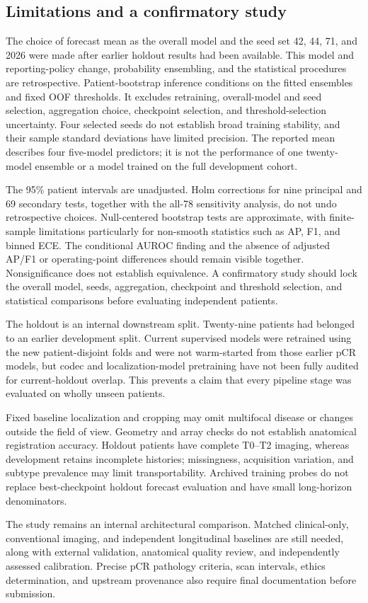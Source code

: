 \subsection{Limitations and a confirmatory study}
\label{sec:limitations}
The choice of forecast mean as the overall model and the seed set 42, 44, 71, and 2026 were made after earlier holdout results had been available. This model and reporting-policy change, probability ensembling, and the statistical procedures are retrospective. Patient-bootstrap inference conditions on the fitted ensembles and fixed OOF thresholds. It excludes retraining, overall-model and seed selection, aggregation choice, checkpoint selection, and threshold-selection uncertainty. Four selected seeds do not establish broad training stability, and their sample standard deviations have limited precision. The reported mean describes four five-model predictors; it is not the performance of one twenty-model ensemble or a model trained on the full development cohort.

The 95\% patient intervals are unadjusted. Holm corrections for nine principal and 69 secondary tests, together with the all-78 sensitivity analysis, do not undo retrospective choices. Null-centered bootstrap tests are approximate, with finite-sample limitations particularly for non-smooth statistics such as AP, F1, and binned ECE. The conditional AUROC finding and the absence of adjusted AP/F1 or operating-point differences should remain visible together. Nonsignificance does not establish equivalence. A confirmatory study should lock the overall model, seeds, aggregation, checkpoint and threshold selection, and statistical comparisons before evaluating independent patients.

The holdout is an internal downstream split. Twenty-nine patients had belonged to an earlier development split. Current supervised models were retrained using the new patient-disjoint folds and were not warm-started from those earlier pCR models, but codec and localization-model pretraining have not been fully audited for current-holdout overlap. This prevents a claim that every pipeline stage was evaluated on wholly unseen patients.

Fixed baseline localization and cropping may omit multifocal disease or changes outside the field of view. Geometry and array checks do not establish anatomical registration accuracy. Holdout patients have complete T0--T2 imaging, whereas development retains incomplete histories; missingness, acquisition variation, and subtype prevalence may limit transportability. Archived training probes do not replace best-checkpoint holdout forecast evaluation and have small long-horizon denominators.

The study remains an internal architectural comparison. Matched clinical-only, conventional imaging, and independent longitudinal baselines are still needed, along with external validation, anatomical quality review, and independently assessed calibration. Precise pCR pathology criteria, scan intervals, ethics determination, and upstream provenance also require final documentation before submission.
